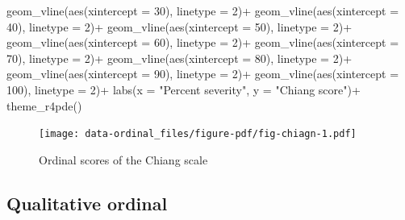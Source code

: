 \documentclass[
  letterpaper,
]{book}
\newenvironment{Shaded}{\begin{snugshade}}{\end{snugshade}}
\newcommand{\AttributeTok}[1]{\textcolor[rgb]{0.40,0.45,0.13}{#1}}
\newcommand{\DecValTok}[1]{\textcolor[rgb]{0.68,0.00,0.00}{#1}}
\newcommand{\FunctionTok}[1]{\textcolor[rgb]{0.28,0.35,0.67}{#1}}
\newcommand{\NormalTok}[1]{\textcolor[rgb]{0.00,0.23,0.31}{#1}}
\newcommand{\SpecialCharTok}[1]{\textcolor[rgb]{0.37,0.37,0.37}{#1}}
\newcommand{\StringTok}[1]{\textcolor[rgb]{0.13,0.47,0.30}{#1}}
\begin{document}
\begin{Shaded}
\begin{Highlighting}[]
  \FunctionTok{geom\_vline}\NormalTok{(}\FunctionTok{aes}\NormalTok{(}\AttributeTok{xintercept =} \DecValTok{30}\NormalTok{), }\AttributeTok{linetype =} \DecValTok{2}\NormalTok{)}\SpecialCharTok{+}
   \FunctionTok{geom\_vline}\NormalTok{(}\FunctionTok{aes}\NormalTok{(}\AttributeTok{xintercept =} \DecValTok{40}\NormalTok{), }\AttributeTok{linetype =} \DecValTok{2}\NormalTok{)}\SpecialCharTok{+}
   \FunctionTok{geom\_vline}\NormalTok{(}\FunctionTok{aes}\NormalTok{(}\AttributeTok{xintercept =} \DecValTok{50}\NormalTok{), }\AttributeTok{linetype =} \DecValTok{2}\NormalTok{)}\SpecialCharTok{+}
   \FunctionTok{geom\_vline}\NormalTok{(}\FunctionTok{aes}\NormalTok{(}\AttributeTok{xintercept =} \DecValTok{60}\NormalTok{), }\AttributeTok{linetype =} \DecValTok{2}\NormalTok{)}\SpecialCharTok{+}
   \FunctionTok{geom\_vline}\NormalTok{(}\FunctionTok{aes}\NormalTok{(}\AttributeTok{xintercept =} \DecValTok{70}\NormalTok{), }\AttributeTok{linetype =} \DecValTok{2}\NormalTok{)}\SpecialCharTok{+}
   \FunctionTok{geom\_vline}\NormalTok{(}\FunctionTok{aes}\NormalTok{(}\AttributeTok{xintercept =} \DecValTok{80}\NormalTok{), }\AttributeTok{linetype =} \DecValTok{2}\NormalTok{)}\SpecialCharTok{+}
   \FunctionTok{geom\_vline}\NormalTok{(}\FunctionTok{aes}\NormalTok{(}\AttributeTok{xintercept =} \DecValTok{90}\NormalTok{), }\AttributeTok{linetype =} \DecValTok{2}\NormalTok{)}\SpecialCharTok{+}
   \FunctionTok{geom\_vline}\NormalTok{(}\FunctionTok{aes}\NormalTok{(}\AttributeTok{xintercept =} \DecValTok{100}\NormalTok{), }\AttributeTok{linetype =} \DecValTok{2}\NormalTok{)}\SpecialCharTok{+}
  \FunctionTok{labs}\NormalTok{(}\AttributeTok{x =} \StringTok{"Percent severity"}\NormalTok{, }\AttributeTok{y =} \StringTok{"Chiang score"}\NormalTok{)}\SpecialCharTok{+}
  \FunctionTok{theme\_r4pde}\NormalTok{()}
\end{Highlighting}
\end{Shaded}

\begin{figure}[H]

{\centering \texttt{[image: data-ordinal\_files/figure-pdf/fig-chiagn-1.pdf]}

}

\caption{\label{fig-chiagn}Ordinal scores of the Chiang scale}

\end{figure}

\hypertarget{qualitative-ordinal}{%
\subsection{Qualitative ordinal}\label{qualitative-ordinal}}
\end{document}
